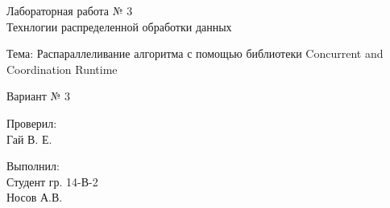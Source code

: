 \thispagestyle{empty}%
\begin{center}%
	\MakeUppercase{\thesisOrganization}
\end{center}%
%
\vspace{0pt plus4fill} %
%
\vspace{0pt plus6fill} %
%
\vspace{0pt plus1fill} %
\begin{center}%

\begin{Large}
Лабораторная работа № 3\\
Технлогии распределенной обработки данных

Тема: Распараллеливание алгоритма с помощью библиотеки Concurrent
and Coordination Runtime

Вариант № 3	
\end{Large}
	
\end{center}%
%
\vspace{0pt plus5fill} %
\begin{flushright}%
Проверил:\\
Гай В. Е.

Выполнил:\\
Студент гр. 14-В-2\\
Носов А.В.
\end{flushright}%
%
\vspace{0pt plus4fill} %
\begin{center}%
	{\thesisCity~ \thesisYear}
\end{center}%
\newpage